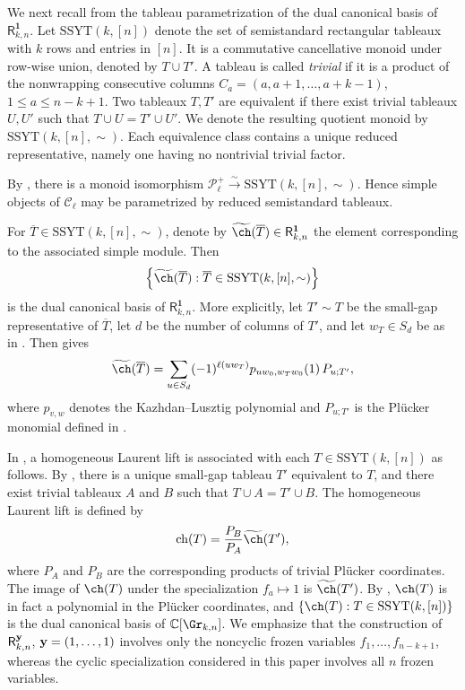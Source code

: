\documentclass[11pt]{amsart}
\numberwithin{equation}{section}
\newcommand{\bC}{{\mathbb C}}
\newcommand{\bfy}{{\bf y}}
\newcommand{\SSYT}{\mathrm{SSYT}}
\begin{document}
We next recall from \cite{CDFL20} the tableau parametrization of the
dual canonical basis of ${\mathsf R}_{k,n}^{\mathbf 1}$.
Let ${\SSYT}(k,[n])$ denote the set of semistandard rectangular tableaux with
$k$ rows and entries in $[n]$.  It is a commutative cancellative
monoid under row-wise union, denoted by $T\cup T'$.  A tableau is
called \emph{trivial} if it is a product of the nonwrapping consecutive
columns $C_a=(a,a+1,\ldots,a+k-1)$, $1\leq a\leq n-k+1$.
Two tableaux $T,T'$ are equivalent if there exist trivial tableaux
$U,U'$ such that $T\cup U=T'\cup U'$.  We denote the resulting
quotient monoid by ${\SSYT}(k,[n],\sim)$.  Each equivalence class
contains a unique reduced representative, namely one having no
nontrivial trivial factor.

By \cite[Theorem~3.17]{CDFL20}, there is a monoid
isomorphism
$\mathcal P_\ell^+
   \xrightarrow{\sim}
   \mathrm{SSYT}(k,[n],\sim)$. 
Hence simple objects of $\mathcal C_\ell$ may be parametrized by
reduced semistandard tableaux.

For $\overline T\in\mathrm{SSYT}(k,[n],\sim)$, denote by
$\widetilde{\ch}(\overline T)\in{\mathsf R}_{k,n}^{\mathbf 1}$
the element corresponding to the associated simple module.  Then
\[
\left\{\widetilde{\ch}(\overline T):
\overline T\in\mathrm{SSYT}(k,[n],\sim)\right\}
\]
is the dual canonical basis of ${\mathsf R}_{k,n}^{\mathbf 1}$.
More explicitly, let $T'\sim T$ be the small-gap representative of
$\overline T$, let $d$ be the number of columns of $T'$, and let
$w_T\in S_d$ be as in \cite[Section~5]{CDFL20}.  Then
\cite[Theorem~5.8]{CDFL20} gives
\begin{equation}\label{eq:prelim-CDFL-KL-formula}
\widetilde{\ch}(\overline T)
=
\sum_{u\in S_d}
(-1)^{\ell(uw_T)}
p_{uw_0,w_Tw_0}(1)\,P_{u;T'},
\end{equation}
where $p_{v,w}$ denotes the Kazhdan--Lusztig polynomial and
$P_{u;T'}$ is the Pl\"ucker monomial defined in
\cite[Definition~5.6]{CDFL20}.

In \cite[Definition~5.9]{CDFL20}, a homogeneous Laurent lift
is associated with each $T\in{\SSYT}(k,[n])$ as follows.
By \cite[Lemma~3.13 and Remark~3.14]{CDFL20},
there is a unique small-gap tableau $T'$
equivalent to $T$, and there exist trivial tableaux
$A$ and $B$ such that $T\cup A=T' \cup B$.
The homogeneous Laurent lift is defined by
\[
\operatorname{ch}(T)
=
\frac{P_B}{P_A}\widetilde{\ch}(T'),
\]
where $P_A$ and $P_B$ are the corresponding products
of trivial Pl\"ucker coordinates. The image of $\ch(T)$ under the specialization $f_a\mapsto1$ is
$\widetilde{\ch}(T')$. 
By \cite[Theorem~3.3]{DGL26},
$\ch(T)$ is in fact a polynomial in the Pl\"ucker coordinates, and
$\{\ch(T):T\in{\SSYT}(k,[n])\}$ is the dual canonical basis of
$\bC[\Gr_{k,n}]$.  We emphasize that the construction of
${\mathsf R}_{k,n}^{\bfy}$, $\bfy=(1,\dots,1)$ involves only the noncyclic frozen
variables $f_1,\ldots,f_{n-k+1}$, whereas the cyclic specialization
considered in this paper involves all $n$ frozen variables.
\end{document}
